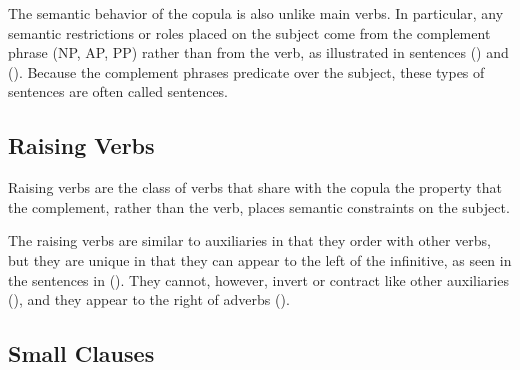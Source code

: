{The semantic behavior of the copula is also unlike main verbs.  In particular,
any semantic restrictions or roles placed on the subject come from the
complement phrase (NP, AP, PP) rather than from the verb, as illustrated in
sentences ({}) and ({}).  Because the complement phrases predicate
over the subject, these types of sentences are often called
 sentences.



\subsection{Raising Verbs}
\label{raising-verbs}

Raising verbs are the class of verbs that share with the copula the property
that the complement, rather than the verb, places semantic constraints on
the subject.  



The raising verbs are similar to auxiliaries in that they order with other
verbs, but they are unique in that they can appear to the left of the
infinitive, as seen in the sentences in ({}).  They cannot, however,
invert or contract like other auxiliaries ({}), and they appear to the
right of adverbs ({}).





\subsection{Small Clauses}

}
